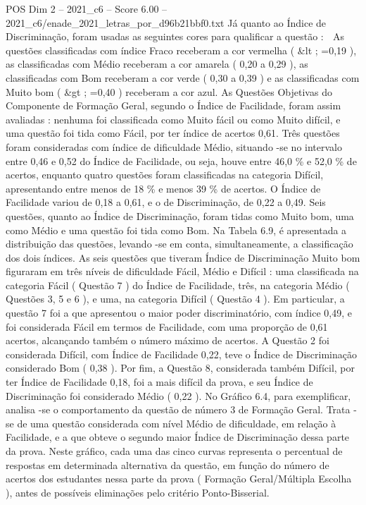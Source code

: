 \begin{textsample}{POS Dim 2 – 2021\_c6 – Score 6.00 – 2021\_c6/enade\_2021\_letras\_por\_d96b21bbf0.txt}
Já quanto ao Índice de Discriminação, foram usadas as seguintes cores para qualificar a questão :  As questões classificadas com índice Fraco receberam a cor vermelha ( \&lt ; =0,19 ), as classificadas com Médio receberam a cor amarela ( 0,20 a 0,29 ), as classificadas com Bom receberam a cor verde ( 0,30 a 0,39 ) e as classificadas com Muito bom ( \&gt ; =0,40 ) receberam a cor azul.
As Questões Objetivas do Componente de Formação Geral, segundo o Índice de Facilidade, foram assim avaliadas : nenhuma foi classificada como Muito fácil ou como Muito difícil, e uma questão foi tida como Fácil, por ter índice de acertos 0,61.
Três questões foram consideradas com índice de dificuldade Médio, situando -se no intervalo entre 0,46 e 0,52 do Índice de Facilidade, ou seja, houve entre 46,0 \% e 52,0 \% de acertos, enquanto quatro questões foram classificadas na categoria Difícil, apresentando entre menos de 18 \% e menos 39 \% de acertos.
O Índice de Facilidade variou de 0,18 a 0,61, e o de Discriminação, de 0,22 a 0,49.
Seis questões, quanto ao Índice de Discriminação, foram tidas como Muito bom, uma como Médio e uma questão foi tida como Bom.
Na Tabela 6.9, é apresentada a distribuição das questões, levando -se em conta, simultaneamente, a classificação dos dois índices.
As seis questões que tiveram Índice de Discriminação Muito bom figuraram em três níveis de dificuldade Fácil, Médio e Difícil : uma classificada na categoria Fácil ( Questão 7 ) do Índice de Facilidade, três, na categoria Médio ( Questões 3, 5 e 6 ), e uma, na categoria Difícil ( Questão 4 ).
Em particular, a questão 7 foi a que apresentou o maior poder discriminatório, com índice 0,49, e foi considerada Fácil em termos de Facilidade, com uma proporção de 0,61 acertos, alcançando também o número máximo de acertos.
A Questão 2 foi considerada Difícil, com Índice de Facilidade 0,22, teve o Índice de Discriminação considerado Bom ( 0,38 ).
Por fim, a Questão 8, considerada também Difícil, por ter Índice de Facilidade 0,18, foi a mais difícil da prova, e seu Índice de Discriminação foi considerado Médio ( 0,22 ).
No Gráfico 6.4, para exemplificar, analisa -se o comportamento da questão de número 3 de Formação Geral.
Trata -se de uma questão considerada com nível Médio de dificuldade, em relação à Facilidade, e a que obteve o segundo maior Índice de Discriminação dessa parte da prova.
Neste gráfico, cada uma das cinco curvas representa o percentual de respostas em determinada alternativa da questão, em função do número de acertos dos estudantes nessa parte da prova ( Formação Geral/Múltipla Escolha ), antes de possíveis eliminações pelo critério Ponto-Bisserial.

\end{textsample}

